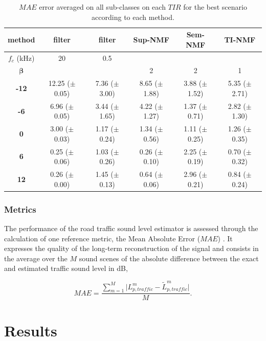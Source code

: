 \documentclass[twocolumn,a4paper,10pt]{article}
\begin{document}
\begin{table}[t]
\centering
\begin{tabular}{@{}cccccc@{}}
\toprule
\textbf{method} & filter & filter & Sup-NMF & Sem-NMF & TI-NMF \\ \midrule
$f_c$ (kHz) & 20 & 0.5 &  &  &  \\
$\mathbf{\beta}$ &  &  & 2 & 2 & 1 \\ \hline
\textbf{-12} & 12.25 ($\pm$ 0.05) & 7.36 ($\pm$ 3.00) & 8.65 ($\pm$ 1.88) & 3.88 ($\pm$ 1.52) & 5.35 ($\pm$ 2.71) \\
\textbf{-6} & 6.96 ($\pm$ 0.05) & 3.44 ($\pm$ 1.65) & 4.22 ($\pm$ 1.27) & 1.37 ($\pm$ 0.71)  & 2.82 ($\pm$ 1.30) \\
\textbf{0} & 3.00 ($\pm$ 0.03) & 1.17 ($\pm$ 0.24) & 1.34 ($\pm$ 0.56) & 1.11 ($\pm$ 0.25) & 1.26 ($\pm$ 0.35) \\
\textbf{6} & 0.25 ($\pm$ 0.06) & 1.03 ($\pm$ 0.26) & 0.26 ($\pm$ 0.10) & 2.25 ($\pm$ 0.19) & 0.70 ($\pm$ 0.32) \\
\textbf{12} & 0.26 ($\pm$ 0.00) & 1.45 ($\pm$ 0.13) & 0.64 ($\pm$ 0.06) & 2.96 ($\pm$ 0.21)  & 0.84 ($\pm$ 0.24) \\ \bottomrule
\end{tabular}
\caption{$MAE$ error averaged on all sub-classes on each $TIR$ for the best scenario according to each method.}
\label{tab:results_TIR}
\end{table}


\subsubsection{Metrics}

The performance of the road traffic sound level estimator is assessed through the calculation of one reference metric, the Mean Absolute Error ($MAE$) \cite{willmott2005advantages}. It expresses the quality of the long-term reconstruction of the signal and consists in the average over the $M$ sound scenes of the absolute difference between the exact and estimated traffic sound level in dB,

\begin{equation}
MAE = \frac{\sum_{m = 1}^M\vert L^m_{p,traffic}-\tilde{L}^m_{p,traffic} \vert}{M}.
\end{equation}

\section{Results}\label{part:results}
\end{document}
